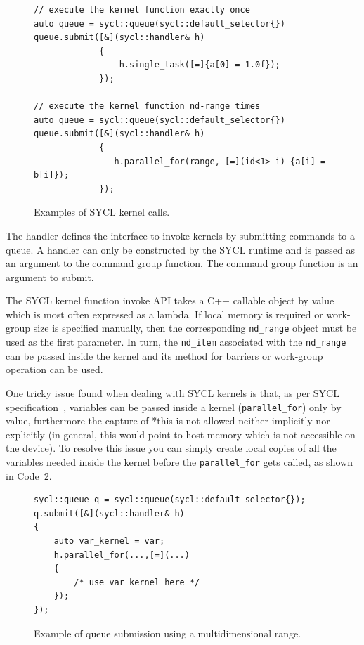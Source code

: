 \begin{figure}[ht!]
\renewcommand{\figurename}{Code}
\begin{verbatim}
// execute the kernel function exactly once
auto queue = sycl::queue(sycl::default_selector{})
queue.submit([&](sycl::handler& h)
             {
                 h.single_task([=]{a[0] = 1.0f});
             });
             
// execute the kernel function nd-range times
auto queue = sycl::queue(sycl::default_selector{})
queue.submit([&](sycl::handler& h)
             {
                h.parallel_for(range, [=](id<1> i) {a[i] = b[i]}); 
             });
\end{verbatim}
\caption{Examples of SYCL kernel calls.}
\label{code:kernel_execution}
\end{figure}

The handler defines the interface to invoke kernels by submitting commands to a queue.
A handler can only be constructed by the SYCL runtime and is passed as an argument to the command group function. The command group function is an argument to submit.

The SYCL kernel function invoke API takes a C++ callable object by value which is most often expressed as a lambda. If local memory is required or work-group size is specified manually, then the corresponding \texttt{nd\_range} object must be used as the first parameter. In turn, the \texttt{nd\_item} associated with the \texttt{nd\_range} can be passed inside the kernel and its method for barriers or work-group operation can be used.


One tricky issue found when dealing with SYCL kernels is that, as per SYCL specification~\cite{sycl_specification}, variables can be passed inside a kernel (\texttt{parallel\_for}) only by value, furthermore the capture of *this is not allowed neither implicitly nor explicitly (in general, this would point to host memory which is not accessible on the device). To resolve this issue you can simply create local copies of all the variables needed inside the kernel before the \texttt{parallel\_for} gets called, as shown in Code~\ref{code:kernel_variables}.

\begin{figure}[ht!]
\renewcommand{\figurename}{Code}
\begin{verbatim}
sycl::queue q = sycl::queue(sycl::default_selector{});
q.submit([&](sycl::handler& h)
{
    auto var_kernel = var;
    h.parallel_for(...,[=](...)
    {
        /* use var_kernel here */               
    });
});
\end{verbatim}
\caption{Example of queue submission using a multidimensional range.}
\label{code:kernel_variables}
\end{figure}

